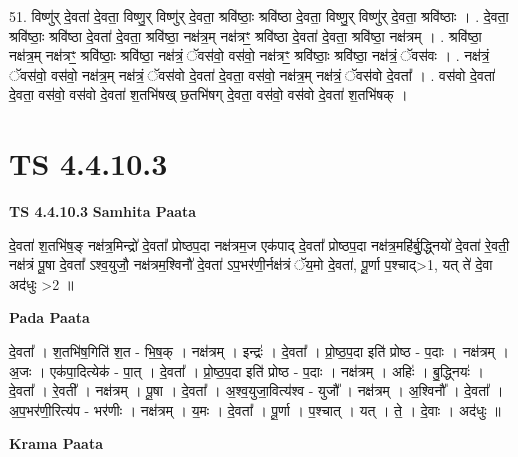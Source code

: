 \documentclass[17pt]{extarticle}
\begin{document}
51. विष्णु॑र् दे॒वता॑ दे॒वता॒ विष्णु॒र् विष्णु॑र् दे॒वता॒ श्रवि॑ष्ठाः॒ श्रवि॑ष्ठा दे॒वता॒ विष्णु॒र् विष्णु॑र् दे॒वता॒ श्रवि॑ष्ठाः । . दे॒वता॒ श्रवि॑ष्ठाः॒ श्रवि॑ष्ठा दे॒वता॑ दे॒वता॒ श्रवि॑ष्ठा॒ नक्ष॑त्र॒म् नक्ष॑त्रꣳ॒॒ श्रवि॑ष्ठा दे॒वता॑ दे॒वता॒ श्रवि॑ष्ठा॒ नक्ष॑त्रम् । . श्रवि॑ष्ठा॒ नक्ष॑त्र॒म् नक्ष॑त्रꣳ॒॒ श्रवि॑ष्ठाः॒ श्रवि॑ष्ठा॒ नक्ष॑त्रं॒ ॅवस॑वो॒ वस॑वो॒ नक्ष॑त्रꣳ॒॒ श्रवि॑ष्ठाः॒ श्रवि॑ष्ठा॒ नक्ष॑त्रं॒ ॅवस॑वः । . नक्ष॑त्रं॒ ॅवस॑वो॒ वस॑वो॒ नक्ष॑त्र॒म् नक्ष॑त्रं॒ ॅवस॑वो दे॒वता॑ दे॒वता॒ वस॑वो॒ नक्ष॑त्र॒म् नक्ष॑त्रं॒ ॅवस॑वो दे॒वता᳚ । . वस॑वो दे॒वता॑ दे॒वता॒ वस॑वो॒ वस॑वो दे॒वता॑ श॒तभि॑षख् छ॒तभि॑षग् दे॒वता॒ वस॑वो॒ वस॑वो दे॒वता॑ श॒तभि॑षक् । \newline
\pagebreak
{}

\section{ TS 4.4.10.3 }

\textbf{TS 4.4.10.3 } \newline
\textbf{Samhita Paata} \newline

दे॒वता॑ श॒तभि॑ष॒ङ् नक्ष॑त्र॒मिन्द्रो॑ दे॒वता᳚ प्रोष्ठप॒दा नक्ष॑त्रम॒ज एक॑पाद् दे॒वता᳚ प्रोष्ठप॒दा नक्ष॑त्र॒महि॑र्बु॒द्ध्नियो॑ दे॒वता॑ रे॒वती॒ नक्ष॑त्रं पू॒षा दे॒वता᳚ ऽश्व॒युजौ॒ नक्ष॑त्रम॒श्विनौ॑ दे॒वता॑ ऽप॒भर॑णी॒र्नक्ष॑त्रं ॅय॒मो दे॒वता॑, पू॒र्णा प॒श्चाद्>1, यत् ते॑ दे॒वा अद॑धुः >2 ॥ \newline

\textbf{Pada Paata} \newline

दे॒वता᳚ । श॒तभि॑ष॒गिति॑ श॒त - भि॒ष॒क् । नक्ष॑त्रम् । इन्द्रः॑ । दे॒वता᳚ । प्रो॒ष्ठ॒प॒दा इति॑ प्रोष्ठ - प॒दाः । नक्ष॑त्रम् । अ॒जः । एक॑पा॒दित्येक॑ - पा॒त् । दे॒वता᳚ । प्रो॒ष्ठ॒प॒दा इति॑ प्रोष्ठ - प॒दाः । नक्ष॑त्रम् । अहिः॑ । बु॒द्ध्नियः॑ । दे॒वता᳚ । रे॒वती᳚ । नक्ष॑त्रम् । पू॒षा । दे॒वता᳚ । अ॒श्व॒युजा॒वित्य॑श्व - युजौ᳚ । नक्ष॑त्रम् । अ॒श्विनौ᳚ । दे॒वता᳚ । अ॒प॒भर॑णी॒रित्य॑प - भर॑णीः । नक्ष॑त्रम् । य॒मः । दे॒वता᳚ । पू॒र्णा । प॒श्चात् । यत् । ते॒ । दे॒वाः । अद॑धुः ॥  \newline


\textbf{Krama Paata} \newline
\end{document}
